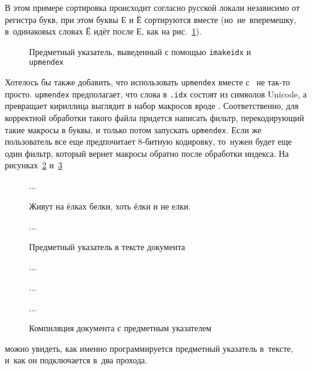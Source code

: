 \documentclass[a4paper,12pt,hyphens]{article}
\newcommand\package[1]{\texttt{#1}}
\newcommand\exe[1]{\texttt{#1}}
\newcommand\file[1]{\texttt{#1}}
\newcommand\lcmd[1]{\texttt{#1}}
\begin{document}
В этом примере сортировка происходит согласно русской локали независимо от регистра букв, при этом буквы
Е и Ё сортируются вместе (но~не~вперемешку, в~одинаковых словах Ё идёт после Е,
как на рис.~\ref{upmendex4}).
\begin{figure}[t]
\begin{tcolorbox}[colback=white,colframe=white]
\small
\vspace*{-2ex}
\printindex
\end{tcolorbox}
\caption{Предметный указатель, выведенный с помощью \package{imakeidx} и
\exe{upmendex}}\label{upmendex4}
\end{figure}
Хотелось бы также добавить, что использовать \exe{upmendex} вместе с \pdfLaTeX\ не так-то просто. \exe{upmendex} предполагает, что слова в \file{.idx} состоят из символов Unicode,
а \pdfLaTeX превращает кириллица выглядит в набор макросов вроде \lcmd{\IeC {\cyrp }}. Соответственно, для корректной обработки такого файла придется написать фильтр, перекодирующий такие макросы в буквы, и только потом запускать \exe{upmendex}. Если же пользователь все еще предпочитает 8-битную кодировку, то~нужен будет еще один фильтр, который вернет макросы обратно после обработки индекса.
На рисунках~\ref{upmendex2} и~\ref{upmendex3}%
\begin{figure}[tp]
\begin{latexcode}
\usepackage[noautomatic]{imakeidx}
\makeindex

...

Живут на ёлках белки, хоть ёлки и не елки.

...

\printindex
\end{latexcode}
\caption{Предметный указатель в тексте документа}\label{upmendex2}
\end{figure}%
\begin{figure}[t]
\begin{shcode}

...


...


...

%
\end{shcode}
\caption{Компиляция документа с предметным указателем}\label{upmendex3}
\end{figure}
можно увидеть, как именно программируется предметный указатель в~тексте, и~как он подключается в~два прохода.
\end{document}
